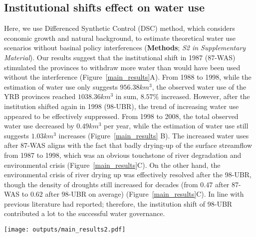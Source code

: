\subsection{Institutional shifts effect on water use}
\label{result-1}

\label{result-1-p2}
Here, we use Differenced Synthetic Control (DSC) method, which considers economic growth and natural background, to estimate theoretical water use scenarios without basinal policy interferences (\textbf{Methods}; \textit{S2 in Supplementary Material}).
Our results suggest that the institutional shift in 1987 (87-WAS) stimulated the provinces to withdraw more water than would have been used without the interference (Figure~\ref{main_results}A).
From 1988 to 1998, while the estimation of water use only suggests $956.38 km^3$, the observed water use of the YRB provinces reached $1038.36 km^3$ in sum, $8.57\%$ increased.
However, after the institution shifted again in 1998 (98-UBR), the trend of increasing water use appeared to be effectively suppressed. From 1998 to 2008, the total observed water use decreased by $0.49 km^3$ per year, while the estimation of water use still suggests $1.03 km^3$ increases (Figure~\ref{main_results} B).
The increased water uses after 87-WAS aligns with the fact that badly drying-up of the surface streamflow from 1987 to 1998, which was an obvious touchstone of river degradation and environmental crisis (Figure~\ref{main_results}C).
On the other hand, the environmental crisis of river drying up was effectively resolved after the 98-UBR, though the density of droughts still increased for decades (from $0.47$ after 87-WAS to $0.62$ after 98-UBR on average) (Figure~\ref{main_results}C).
In line with previous literature had reported; therefore, the institution shift of 98-UBR contributed a lot to the successful water governance. %

\begin{figure*}[!h]
    \centering
    \texttt{[image: outputs/main\_results2.pdf]}
    \caption{
        Effects of two institutional shifts on water resources use and allocation in the Yellow River Basin (YRB).
        \textbf{A.} water uses of the YRB before and after the institutional shift in 1987 (87-WAS);
        \textbf{B.} water uses of the YRB before and after the institutional shift in 1998 (98-UBR). While the blue lines are statistic water use data, the grey ones are the estimation from the Differenced Synthetic Control method with economic and environmental background controlled.
        \textbf{C.} Drought intensity in the YRB and drying up events of the Yellow River. The size of the grey bubbles denotes the length of a drying upstream.
    }
    \label{main_results}
\end{figure*}

